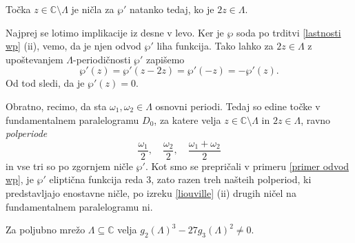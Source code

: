 \documentclass[mat1]{fmfdelo}
\numberwithin{equation}{section}
\newcommand{\C}{\mathbb C}
\newcommand{\om}{\omega}
\theoremstyle{definition}
\begin{document}
%
%
\begin{lema}
    \label{polperiode so nicle odvoda wp}
    Točka $z \in \C\setminus\Lambda$ je ničla za $\wp'$ natanko tedaj, ko je $2z \in \Lambda$.
\end{lema}

\begin{dokaz}
    Najprej se lotimo implikacije iz desne v levo. Ker je $\wp$ soda po trditvi \ref{lastnosti wp} (ii), vemo, da je njen odvod $\wp'$ liha funkcija. Tako lahko za $2z\in \Lambda$ z upoštevanjem $\Lambda$-periodičnosti $\wp'$ zapišemo
    \[
        \wp'(z) = \wp'(z - 2z) = \wp'(-z) = -\wp'(z).
    \]
    Od tod sledi, da je $\wp'(z) = 0$.

    Obratno, recimo, da sta $\om_1, \om_2 \in \Lambda$ osnovni periodi. Tedaj so edine točke v fundamentalnem paralelogramu $D_0$, za katere velja $z \in \C\setminus\Lambda$ in $2z\in\Lambda$, ravno \emph{polperiode}
    \[
        \frac{\om_1}{2}, \quad \frac{\om_2}{2}, \quad \frac{\om_1 + \om_2}{2} 
    \]
    in vse tri so po zgornjem ničle $\wp'$. Kot smo se prepričali v primeru \ref{primer odvod wp}, je $\wp'$ eliptična funkcija reda $3$, zato razen treh našteih polperiod, ki predstavljajo enostavne ničle, po izreku \ref{liouville} (ii) drugih ničel na fundamentalnem paralelogramu ni.   
\end{dokaz}

\begin{lema}
    \label{nenicelna diskriminanta}
    Za poljubno mrežo $\Lambda \subseteq \C$ velja $g_2(\Lambda)^3 - 27g_3(\Lambda)^2 \neq 0$.
\end{lema}
\end{document}
